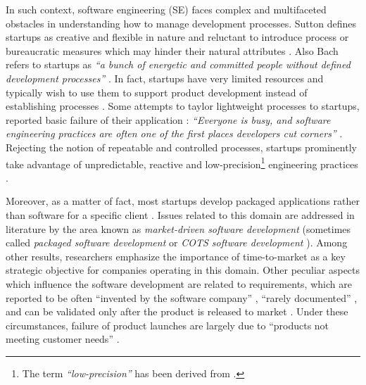 \documentclass[final,5p,times,twocolumn]{elsarticle}
\begin{document}
In such context, software engineering (SE) faces complex and multifaceted obstacles in understanding how to manage development processes. Sutton defines startups as creative and flexible in nature and reluctant to introduce process or bureaucratic measures which may hinder their natural attributes \cite{Sutton2000}. Also Bach refers to startups as \textit{``a bunch of energetic and committed people without defined development processes''} \cite{Bach1998}. In fact, startups have very limited resources and typically wish to use them to support product development instead of establishing processes \cite{Coleman2008, Heitlager2007}. Some attempts to taylor lightweight processes to startups, reported basic failure of their application : \textit{``Everyone is busy, and software engineering practices are often one of the first places developers cut corners''} \cite{Martin2007}. Rejecting the notion of repeatable and controlled processes, startups prominently take advantage of unpredictable, reactive and low-precision\footnote{The term \textit{``low-precision''} has been derived from \cite{surviving-os-cockburn}.} engineering practices \cite{Sutton2000, Tanabian2005, Chorev2006, Kakati2003}.

Moreover, as a matter of fact, most startups develop packaged applications rather than software for a specific client \cite{genome2012}. Issues related to this domain are addressed in literature by the area known as \textit{market-driven software development} (sometimes called \textit{packaged software development} or \textit{COTS software development} \cite{Alves2006}). Among other results, researchers emphasize the importance of time-to-market as a key strategic objective \cite{dagMDR,dagMDR,sawyer99} for companies operating in this domain.  Other peculiar aspects which influence the software development are related to requirements, which are reported to be often ``invented by the software company'' \cite{512553}, ``rarely documented'' \cite{Karlsson02challengesin}, and can be validated only after the product is released to market \cite{dahl2003,Keil:1995}. Under these circumstances, failure of product launches are largely due to ``products not meeting customer needs''  \cite{Alves2006}.
\end{document}
